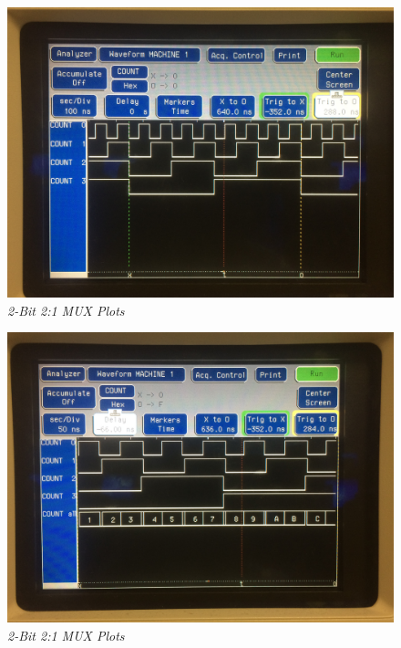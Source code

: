 \documentclass[a4paper,12pt]{article}
\begin{document}
\begin{figure}[h]
  \begin{center}
    \includegraphics[scale=.1]{IMG_8621.JPG}
    \caption{\textit{2-Bit 2:1 MUX Plots}}
  \end{center}
\end{figure}
\newpage
\begin{figure}[h]
  \begin{center}
    \includegraphics[scale=.1]{IMG_8622.JPG}
    \caption{\textit{2-Bit 2:1 MUX Plots}}
  \end{center}
\end{figure}
\newpage
\end{document}
